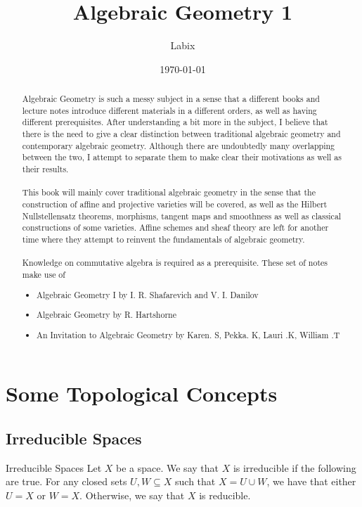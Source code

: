 \documentclass[a4paper]{article}
\title{Algebraic Geometry 1}
\author{Labix}
\date{\today}
\begin{document}
\maketitle
\begin{abstract}
Algebraic Geometry is such a messy subject in a sense that a different books and lecture notes introduce different materials in a different orders, as well as having different prerequisites. After understanding a bit more in the subject, I believe that there is the need to give a clear distinction between traditional algebraic geometry and contemporary algebraic geometry. Although there are undoubtedly many overlapping between the two, I attempt to separate them to make clear their motivations as well as their results. \\~\\

This book will mainly cover traditional algebraic geometry in the sense that the construction of affine and projective varieties will be covered, as well as the Hilbert Nullstellensatz theorems, morphisms, tangent maps and smoothness as well as classical constructions of some varieties. Affine schemes and sheaf theory are left for another time where they attempt to reinvent the fundamentals of algebraic geometry. \\~\\

Knowledge on commutative algebra is required as a prerequisite. These set of notes make use of
\begin{itemize}
\item Algebraic Geometry I by I. R. Shafarevich and V. I. Danilov
\item Algebraic Geometry by R. Hartshorne
\item An Invitation to Algebraic Geometry by Karen. S, Pekka. K, Lauri .K, William .T
\end{itemize}
\end{abstract}
\pagebreak
\tableofcontents
\pagebreak

\section{Some Topological Concepts}
\subsection{Irreducible Spaces}
\begin{defn}{Irreducible Spaces}{} Let $X$ be a space. We say that $X$ is irreducible if the following are true. For any closed sets $U,W\subseteq X$ such that $X=U\cup W$, we have that either $U=X$ or $W=X$. Otherwise, we say that $X$ is reducible. 
\end{defn}
\end{document}
